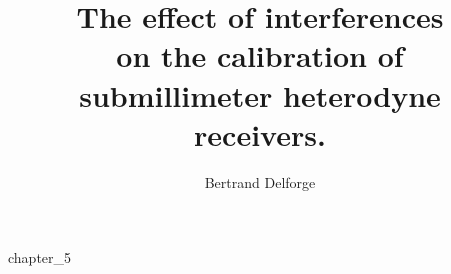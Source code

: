 \documentclass[a4paper,11pt]{book}
\newif\ifDraft
\begin{document}
\pagestyle{fancy}

\frontmatter
    \title{
        The effect of interferences\\
        on the calibration of\\
        submillimeter heterodyne receivers.\\
    }
    \author{Bertrand Delforge}
    \setcounter{secnumdepth}{3}
    \setcounter{tocdepth}{2}
    \ifDraft
       \renewcommand*\contentsname{Content \today}
    \fi
    \tableofcontents
\mainmatter




    \setcounter{chapter}{3}
    {chapter_5}



\backmatter

    \printbibliography[
        heading=bibintoc,
        ]


\end{document}
